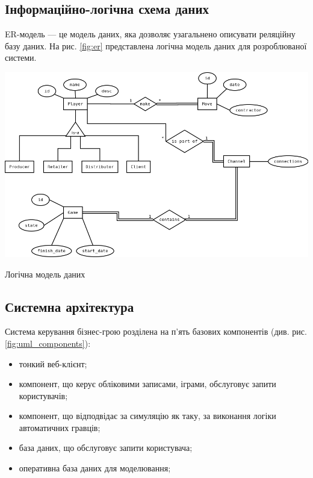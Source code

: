 \subsection{Інформаційно-логічна схема даних}
ER-модель --- це модель даних, яка дозволяє узагальнено описувати реляційну базу даних. На рис. \ref{fig:er} представлена логічна модель даних для розроблюваної системи.

\begin{stdfigure}
    \includegraphics[width=7in]{images/er.png}
    \caption{Логічна модель даних}
    \label{fig:er}
\end{stdfigure}   

\subsection{Системна архітектура}
Система керування бізнес-грою розділена на п’ять базових компонентів (див. рис. \ref{fig:uml_components}): 
\begin{itemize}
\item тонкий веб-клієнт;
\item компонент, що керує обліковими записами, іграми, обслуговує запити користувачів;
\item компонент, що відподвідає за симуляцію як таку, за виконання логіки автоматичних гравців;
\item база даних, що обслуговує запити користувача;
\item оперативна база даних для моделювання;
\end{itemize}

